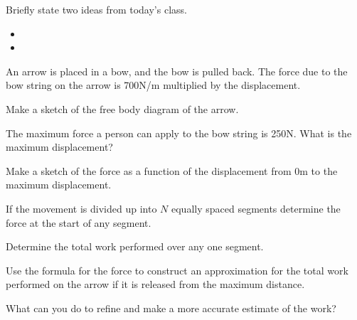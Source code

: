 \postClass

\begin{problem}
\item Briefly state two ideas from today's class.
  \begin{itemize}
  \item 
  \item 
  \end{itemize}
\item An arrow is placed in a bow, and the bow is pulled back. The
  force due to the bow string on the arrow is 700N/m multiplied by the
  displacement. 
  \begin{subproblem}
  \item Make a sketch of the free body diagram of the arrow.
    \vfill
  \item The maximum force a person can apply to the bow string is
    250N. What is the maximum displacement?  
    \vfill
  \item Make a sketch of the force as a function of the displacement
    from 0m to the maximum displacement.
    \vfill
    \clearpage
  \item If the movement is divided up into $N$ equally spaced segments
    determine the force at the start of any segment.
    \vfill
  \item Determine the total work performed over any one segment.
    \vfill
  \item Use the formula for the force to construct an approximation
    for the total work performed on the arrow if it is released from
    the maximum distance.
    \vfill
  \item What can you do to refine and make a more accurate estimate of
    the work?
  \end{subproblem}
\end{problem}



